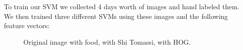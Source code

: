 To train our SVM we collected $4$ days worth of images and hand labeled them. We then trained three different SVMs using
these images and the following feature vectors:
\begin{figure}[!h]
\begin{center}
\caption[]{ Original image with food,  with Shi Tomassi,
 with HOG.}
\label{fig:food}
\end{center}
\end{figure}
